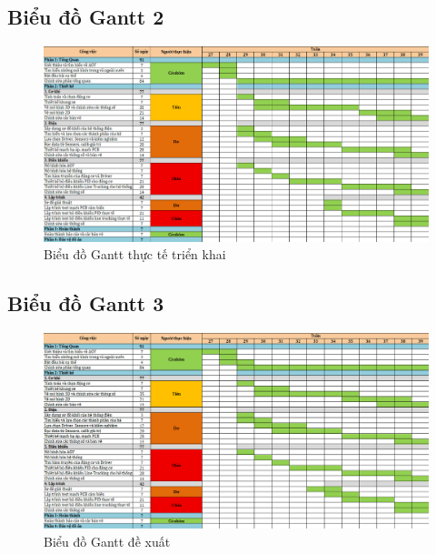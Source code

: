         \subsection{Biểu đồ Gantt 2}
            \begin{figure}[H]
                \centering
                \includegraphics[width=0.8\textheight,angle=-90]{pictures/appendix/gantt2.png}
                \caption{Biểu đồ Gantt thực tế triển khai}
                \label{gantt2}
            \end{figure}
        \subsection{Biểu đồ Gantt 3}
            \begin{figure}[H]
                \centering
                \includegraphics[width=0.8\textheight,angle=-90]{pictures/appendix/gantt3.png}
                \caption{Biểu đồ Gantt đề xuất}
                \label{gantt3}
            \end{figure}
        
